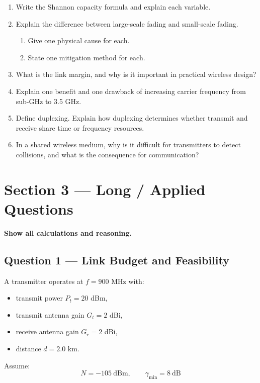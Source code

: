 \documentclass[11pt,a4paper]{article}
\begin{document}
\begin{enumerate}[leftmargin=0.9cm]
\item Write the Shannon capacity formula and explain each variable.

\item Explain the difference between large-scale fading and small-scale fading.
\begin{enumerate}[label=\alph*)]
    \item Give one physical cause for each.
    \item State one mitigation method for each.
\end{enumerate}

\item What is the link margin, and why is it important in practical wireless design?

\item Explain one benefit and one drawback of increasing carrier frequency from sub-GHz to 3.5 GHz.

\item Define duplexing. Explain how duplexing determines whether transmit and receive share time or frequency resources.

\item In a shared wireless medium, why is it difficult for transmitters to detect collisions, and what is the consequence for communication?
\end{enumerate}

\newpage
\section*{Section 3 --- Long / Applied Questions}
\textbf{Show all calculations and reasoning.}

\subsection*{Question 1 --- Link Budget and Feasibility}
A transmitter operates at $f = 900$ MHz with:
\begin{itemize}[leftmargin=1.2cm]
    \item transmit power $P_t = 20$ dBm,
    \item transmit antenna gain $G_t = 2$ dBi,
    \item receive antenna gain $G_r = 2$ dBi,
    \item distance $d = 2.0$ km.
\end{itemize}

Assume:
\[
N = -105\ \mathrm{dBm}, \qquad \gamma_{\min} = 8\ \mathrm{dB}
\]
\end{document}

